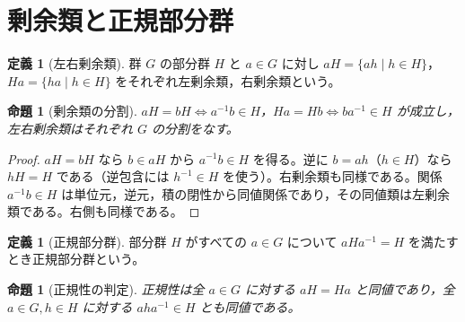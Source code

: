 \documentclass[a5paper,10pt,dvipdfmx]{jsarticle}
\theoremstyle{definition}
\newtheorem{defn}[ruledef]{定義}
\theoremstyle{plain}
\newtheorem{prop}[ruledef]{命題}
\begin{document}
\section{剰余類と正規部分群}
\begin{defn}[左右剰余類]\label{k263}
群 $G$ の部分群 $H$ と $a\in G$ に対し $aH=\{ah\mid h\in H\}$，$Ha=\{ha\mid h\in H\}$ をそれぞれ左剰余類，右剰余類という。
\end{defn}
\begin{prop}[剰余類の分割]\label{k264}
$aH=bH\iff a^{-1}b\in H$，$Ha=Hb\iff ba^{-1}\in H$ が成立し，左右剰余類はそれぞれ $G$ の分割をなす。
\end{prop}
\begin{proof}
$aH=bH$ なら $b\in aH$ から $a^{-1}b\in H$ を得る。逆に $b=ah$（$h\in H$）なら $hH=H$ である（逆包含には $h^{-1}\in H$ を使う）。右剰余類も同様である。関係 $a^{-1}b\in H$ は単位元，逆元，積の閉性から同値関係であり，その同値類は左剰余類である。右側も同様である。
\end{proof}
\begin{defn}[正規部分群]\label{k265}
部分群 $H$ がすべての $a\in G$ について $aHa^{-1}=H$ を満たすとき正規部分群という。
\end{defn}
\begin{prop}[正規性の判定]\label{k266}
正規性は全 $a\in G$ に対する $aH=Ha$ と同値であり，全 $a\in G,h\in H$ に対する $aha^{-1}\in H$ とも同値である。
\end{prop}
\end{document}
